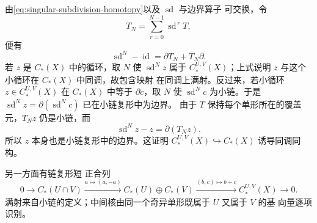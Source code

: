 由\eqref{eq:singular-subdivision-homotopy}以及 $\operatorname{sd}$ 与边界算子
可交换，令
\[
 T_N=\sum_{r=0}^{N-1}\operatorname{sd}^{\,r}T,
\]
便有
\begin{equation}\label{eq:iterated-subdivision-homotopy}
 \operatorname{sd}^{N}-\operatorname{id}=\partial T_N+T_N\partial.
\end{equation}
若 $z$ 是 $C_*(X)$ 中的循环，取 $N$ 使 $\operatorname{sd}^Nz$ 属于
$C_*^{U,V}(X)$；上式说明 $z$ 与这个小循环在 $C_*(X)$ 中同调，故包含映射
在同调上满射。反过来，若小循环 $z\in C_*^{U,V}(X)$ 在 $C_*(X)$ 中等于
$\partial c$，取 $N$ 使 $\operatorname{sd}^Nc$ 为小链。于是
$\operatorname{sd}^Nz=\partial(\operatorname{sd}^Nc)$ 已在小链复形中为边界。
由于 $T$ 保持每个单形所在的覆盖元，$T_Nz$ 仍是小链，而
\[
 \operatorname{sd}^Nz-z=\partial(T_Nz).
\]
所以 $z$ 本身也是小链复形中的边界。这证明
$C_*^{U,V}(X)\hookrightarrow C_*(X)$ 诱导同调同构。

另一方面有链复形短
正合列
\begin{equation}\label{eq:singular-mv-short-exact}
 0\longrightarrow C_*(U\cap V)
 \xrightarrow{a\mapsto(a,-a)} C_*(U)\oplus C_*(V)
 \xrightarrow{(b,c)\mapsto b+c} C_*^{U,V}(X)
 \longrightarrow0.
\end{equation}
满射来自小链的定义；中间核由同一个奇异单形既属于 $U$ 又属于 $V$ 的基
向量逐项识别。

